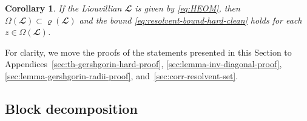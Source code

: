 \documentclass{SciPost}
\newtheorem{theorem}{Theorem}
\newtheorem{corollary}{Corollary}
\newtheorem{definition}{Definition}
\begin{document}
\begin{corollary}
    If the Liouvillian $\mathbfcal L$ is given by \eqref{eq:HEOM}, then $\Omega(\mathbfcal L) \subset \varrho(\mathbfcal L)$ and the bound
    \eqref{eq:resolvent-bound-hard-clean} holds for each $z \in \Omega(\mathbfcal L)$.
    \label{cor:resolvent-set}
\end{corollary}
For clarity, we move the proofs of the statements presented in this Section to Appendices~\ref{sec:th-gershgorin-hard-proof}, \ref{sec:lemma-inv-diagonal-proof}, \ref{sec:lemma-gershgorin-radii-proof}, and~\ref{sec:corr-resolvent-set}. 
\newcommand{\dist}{\operatorname{dist}}
% 
% 
% 
% 
% 
% 
% 
\subsection{Block decomposition}

\newcommand{\LI}{{\mathbb T}}
\newcommand{\LJ}{{\overline {\mathbb T}}}
\newcommand{\LII}{{\LI\LI}}
\newcommand{\LIJ}{{\LI\LJ}}
\newcommand{\LJI}{{\LJ\LI}}
\newcommand{\LJJ}{{\LJ\LJ}}
\end{document}
